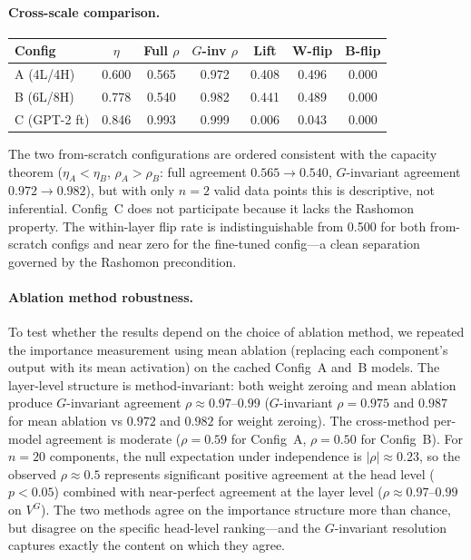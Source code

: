 \documentclass[11pt,a4paper]{article}
\begin{document}
\paragraph{Cross-scale comparison.}
\begin{center}
\small
\begin{tabular}{@{}lcccccc@{}}
\toprule
Config & $\eta$ & Full $\rho$ & $G$-inv $\rho$ & Lift & W-flip & B-flip \\
\midrule
A (4L/4H) & 0.600 & 0.565 & 0.972 & 0.408 & 0.496 & 0.000 \\
B (6L/8H) & 0.778 & 0.540 & 0.982 & 0.441 & 0.489 & 0.000 \\
C (GPT-2 ft) & 0.846 & 0.993 & 0.999 & 0.006 & 0.043 & 0.000 \\
\bottomrule
\end{tabular}
\end{center}
The two from-scratch configurations are ordered consistent with the capacity theorem ($\eta_A < \eta_B$, $\rho_A > \rho_B$: full agreement $0.565 \to 0.540$, $G$-invariant agreement $0.972 \to 0.982$), but with only $n = 2$ valid data points this is descriptive, not inferential.  Config~C does not participate because it lacks the Rashomon property.  The within-layer flip rate is indistinguishable from 0.500 for both from-scratch configs and near zero for the fine-tuned config---a clean separation governed by the Rashomon precondition.

\paragraph{Ablation method robustness.}
To test whether the results depend on the choice of ablation method, we repeated the importance measurement using mean ablation (replacing each component's output with its mean activation) on the cached Config~A and~B models.  The layer-level structure is method-invariant: both weight zeroing and mean ablation produce $G$-invariant agreement $\rho \approx 0.97$--$0.99$ ($G$-invariant $\rho = 0.975$ and $0.987$ for mean ablation vs $0.972$ and $0.982$ for weight zeroing).  The cross-method per-model agreement is moderate ($\rho = 0.59$ for Config~A, $\rho = 0.50$ for Config~B).  For $n = 20$ components, the null expectation under independence is $|\rho| \approx 0.23$, so the observed $\rho \approx 0.5$ represents significant positive agreement at the head level ($p < 0.05$) combined with near-perfect agreement at the layer level ($\rho \approx 0.97$--$0.99$ on $V^G$).  The two methods agree on the importance structure more than chance, but disagree on the specific head-level ranking---and the $G$-invariant resolution captures exactly the content on which they agree.
\end{document}
